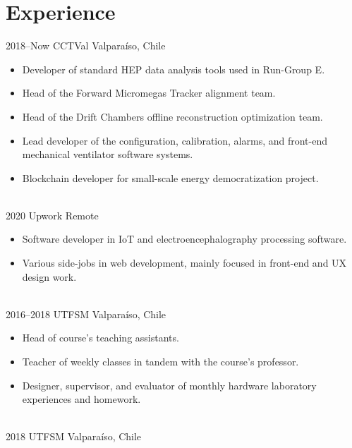 \documentclass[a4paper]{cv-style}
\begin{document}
\section{Experience}
    \begin{entrylist}
        \entry
            {2018--Now}
            {CCTVal}
            {Valpara\'iso, Chile}
            {
            \begin{itemize}
                \item Developer of standard HEP data analysis tools used in Run-Group E.
                \item Head of the Forward Micromegas Tracker alignment team.
                \item Head of the Drift Chambers offline reconstruction optimization team.
                \item Lead developer of the configuration, calibration, alarms, and front-end mechanical ventilator software systems.
                \item Blockchain developer for small-scale energy democratization project.
            \end{itemize}} \\
        \entry
            {2020}
            {Upwork}
            {Remote}
            {
            \begin{itemize}
                \item Software developer in IoT and electroencephalography processing software.
                \item Various side-jobs in web development, mainly focused in front-end and UX design work.
            \end{itemize}} \\
        \entry
            {2016--2018}
            {UTFSM}
            {Valpara\'iso, Chile}
            {
            \begin{itemize}
                \item Head of course's teaching assistants.
                \item Teacher of weekly classes in tandem with the course's professor.
                \item Designer, supervisor, and evaluator of monthly hardware laboratory experiences and homework.
            \end{itemize}} \\
        \entry
            {2018}
            {UTFSM}
            {Valpara\'iso, Chile}

\end{entrylist}
\end{document}
